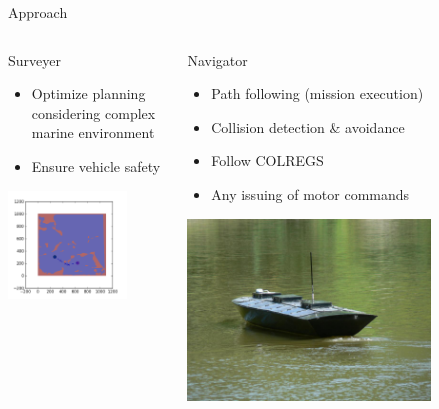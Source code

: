 \documentclass[9pt]{beamer}
\begin{document}
\begin{frame}{Approach}
\begin{columns}
\begin{column}{0.33\textwidth}
\begin{block}{Surveyer}
\begin{center}
\begin{itemize}
                        \item Optimize planning considering complex marine environment
                        \item Ensure vehicle safety
                    \end{itemize}
                    \includegraphics[width=0.75\textwidth,trim={4cm 2cm 4cm 6cm},clip]{img/samplepath.png}
                \end{center}
            \end{block}
        \end{column}
        \begin{column}{0.33\textwidth}
            \begin{block}{Navigator}
                \begin{itemize}
	                \item Path following (mission execution)
    	            \item Collision detection \& avoidance
                    \item Follow COLREGS
	                \item Any issuing of motor commands
                \end{itemize}
                \includegraphics[width=0.75\textwidth,trim={1cm 1cm 1cm 1cm},clip]{img/usv.jpeg}
            \end{block}
        \end{column}
    \end{columns}
\end{frame}  
\end{document}
